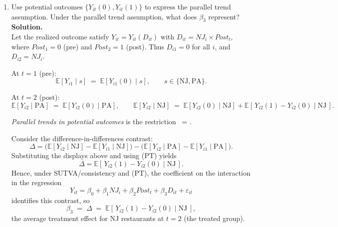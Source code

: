 \documentclass[12pt]{article}
\begin{document}
\begin{enumerate}[label=\textbf{(\alph*)}, leftmargin=1.5em]
  For PA restaurants, $NJ_i=0$ so
  \[
  D_{i2}=0 \;\Rightarrow\; Y_{i2}=Y_{i2}(0),
  \]
  and the treated potential outcome is never observed in PA. Therefore,
  \[
  E\!\left[Y_{i2}(1)\mid PA\right] \quad \text{is \emph{not} identified from the data alone}.
  \]
  To learn about $E[Y_{i2}(1)\mid PA]$ one would need additional assumptions or structure
  (e.g., treatment-effect homogeneity or a difference-in-differences/parallel-trends argument),
  but it is not directly estimable from the observed outcomes.

  \item Use potential outcomes $\{Y_{it}(0),Y_{it}(1)\}$ to express the parallel trend assumption. Under the parallel trend assumption, what does $\beta_3$ represent?\\[0.5em]
  
  \textbf{Solution.} \\
  Let the realized outcome satisfy $Y_{it}=Y_{it}(D_{it})$ with
  $D_{it}=NJ_i\times Post_t$, where $Post_1=0$ (pre) and $Post_2=1$ (post).
  Thus $D_{i1}=0$ for all $i$, and $D_{i2}=NJ_i$.

  At $t=1$ (pre):
  \[
  \mathbb{E}[Y_{i1}\mid s] \;=\; \mathbb{E}[Y_{i1}(0)\mid s], 
  \qquad s\in\{\text{NJ},\text{PA}\}.
  \]

  At $t=2$ (post):
  \[
  \mathbb{E}[Y_{i2}\mid \text{PA}] \;=\; \mathbb{E}[Y_{i2}(0)\mid \text{PA}], 
  \qquad
  \mathbb{E}[Y_{i2}\mid \text{NJ}] \;=\; \mathbb{E}[Y_{i2}(0)\mid \text{NJ}] 
  + \mathbb{E}[\,Y_{i2}(1)-Y_{i2}(0)\mid \text{NJ}\,].
  \]

  \emph{Parallel trends in potential outcomes} is the restriction
  \
  \!
  \;=\;
  \!.
  \]

  Consider the difference-in-differences contrast:
  \[
  \Delta 
  = \big(\mathbb{E}[Y_{i2}\mid \text{NJ}]-\mathbb{E}[Y_{i1}\mid \text{NJ}]\big)
  -\big(\mathbb{E}[Y_{i2}\mid \text{PA}]-\mathbb{E}[Y_{i1}\mid \text{PA}]\big).
  \]
  Substituting the displays above and using \textnormal{(PT)} yields
  \[
  \Delta 
  = \mathbb{E}[\,Y_{i2}(1)-Y_{i2}(0)\mid \text{NJ}\,].
  \]
  Hence, under SUTVA/consistency and (PT), the coefficient on the interaction
  in the regression
  \[
  Y_{it}=\beta_0+\beta_1 NJ_i+\beta_2 Post_t+\beta_3 D_{it}+\varepsilon_{it}
  \]
  identifies this contrast, so
  \[
  \beta_3 \;=\; \Delta
  \;=\; \mathbb{E}[\,Y_{i2}(1)-Y_{i2}(0)\mid \text{NJ}\,],
  \]
  the average treatment effect for NJ restaurants at $t=2$ (the treated group).
  
\end{enumerate}
\end{document}
